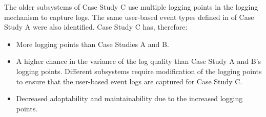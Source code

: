 The older subsystems of Case Study C use multiple logging points in the logging mechanism to capture logs. The same user-based event types defined in  of Case Study A were also identified. Case Study C has, therefore:

\begin{itemize}
	\item More logging points than Case Studies A and B. 
	\item A higher chance in the variance of the log quality than Case Study A and B's logging points. Different subsystems require modification of the logging points to ensure that the user-based event logs are captured for Case Study C.
	\item Decreased adaptability and maintainability due to the increased logging points.
\end{itemize}

